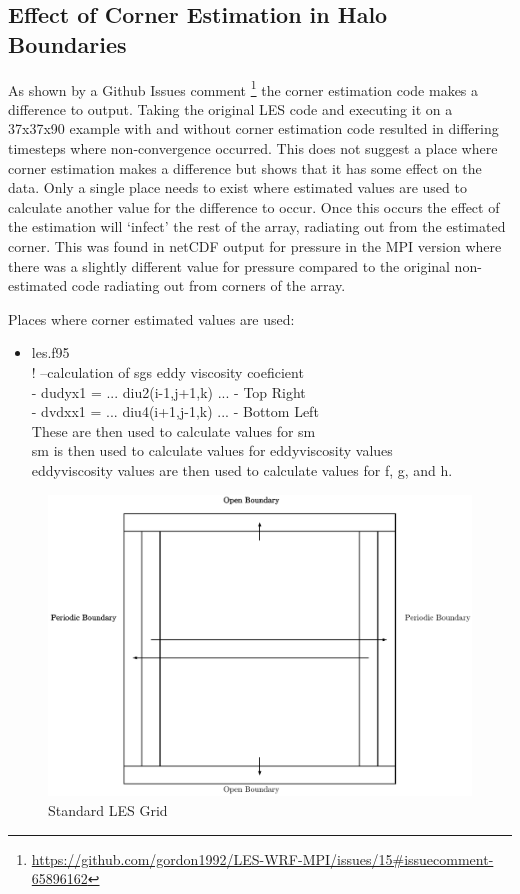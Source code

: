 \documentclass{article}
\begin{document}
\subsection{Effect of Corner Estimation in Halo Boundaries}

As shown by a Github Issues comment
\footnote{\url{https://github.com/gordon1992/LES-WRF-MPI/issues/15#issuecomment-65896162}}
the corner estimation code makes a difference to output. Taking the original LES
code and executing it on a 37x37x90 example with and without corner estimation
code resulted in differing timesteps where non-convergence occurred. This does
not suggest a place where corner estimation makes a difference but shows that it
has some effect on the data. Only a single place needs to exist where estimated
values are used to calculate another value for the difference to occur. Once
this occurs the effect of the estimation will `infect' the rest of the array,
radiating out from the estimated corner. This was found in netCDF output for
pressure in the MPI version where there was a slightly different value for
pressure compared to the original non-estimated code radiating out from corners
of the array.

Places where corner estimated values are used:

\begin{itemize}
    \item les.f95\\
    ! --calculation of sgs eddy viscosity coeficient\\
    - dudyx1 = ... diu2(i-1,j+1,k) ... - Top Right\\
    - dvdxx1 = ... diu4(i+1,j-1,k) ... - Bottom Left\\
    These are then used to calculate values for sm\\
    sm is then used to calculate values for eddyviscosity values\\
    eddyviscosity values are then used to calculate values for f, g, and h.
\end{itemize}

\begin{figure}
    \includegraphics[width=\linewidth]{Diagrams/standardLESGrid.pdf}
    \caption{Standard LES Grid}
    \label{fig:standardLESGrid}
\end{figure}
\end{document}
